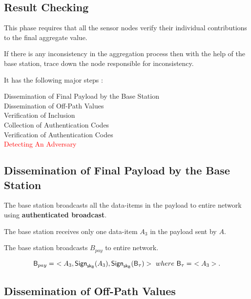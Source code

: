 \documentclass[%
  slidesonly,%
  semlayer%
  ]{seminar}                                  %
\newcommand{\sk}{\sf{sk}}
\begin{document}
\begin{slide}
    \subsection*{Result Checking}
      This phase requires that all the sensor nodes verify their individual contributions to the final aggregate value.

      If there is any inconsistency in the aggregation process then with the help of the base station, trace down the node responsible for inconsistency.

      It has the following major steps :
      \begin{description}
        \item [Dissemination of Final Payload by the Base Station]
        \item [Dissemination of Off-Path Values]
        \item [Verification of Inclusion]
        \item [Collection of Authentication Codes]
        \item [Verification of Authentication Codes]
        \item [\textcolor{red}{Detecting An Adversary}]
      \end{description}

      \vfill
      \clearpage

    \subsection*{Dissemination of Final Payload by the Base Station}

      The base station broadcasts all the data-items in the payload to entire network using \textbf{authenticated broadcast}.
        
      The base station receives only one data-item $A_{3}$ in the payload sent by $A$.
      
      The base station broadcasts $B_{pay}$ to entire network.

      \begin{equation*}
        \textsf{B}_{pay} =\ <A_{3}, \textsf{Sign}_{\sk_{\textsf{B}}}(A_{3}), \textsf{Sign}_{\sk_{\textsf{B}}}(\textsf{B}_{\tau})>\ where\ \textsf{B}_{\tau} =\ <A_{3}>.
      \end{equation*}
      \vfill
      \clearpage

    \subsection*{Dissemination of Off-Path Values}
        

\end{slide}
\end{document}

